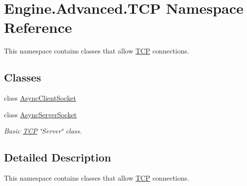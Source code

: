 \hypertarget{namespace_engine_1_1_advanced_1_1_t_c_p}{}\section{Engine.\+Advanced.\+T\+CP Namespace Reference}
\label{namespace_engine_1_1_advanced_1_1_t_c_p}


This namespace contains classes that allow \mbox{\hyperlink{namespace_engine_1_1_advanced_1_1_t_c_p}{T\+CP}} connections.  


\subsection*{Classes}
\begin{DoxyCompactItemize}
\item 
class \mbox{\hyperlink{class_engine_1_1_advanced_1_1_t_c_p_1_1_async_client_socket}{Async\+Client\+Socket}}
\item 
class \mbox{\hyperlink{class_engine_1_1_advanced_1_1_t_c_p_1_1_async_server_socket}{Async\+Server\+Socket}}
\begin{DoxyCompactList}\small\item\em Basic \mbox{\hyperlink{namespace_engine_1_1_advanced_1_1_t_c_p}{T\+CP}} \char`\"{}\+Server\char`\"{} class. \end{DoxyCompactList}\end{DoxyCompactItemize}


\subsection{Detailed Description}
This namespace contains classes that allow \mbox{\hyperlink{namespace_engine_1_1_advanced_1_1_t_c_p}{T\+CP}} connections. 

